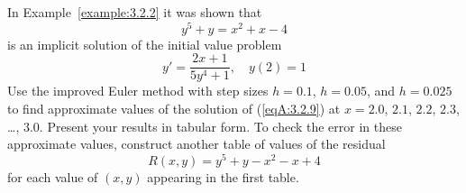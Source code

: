 \documentclass{ximera}
\begin{document}
\begin{problem}\label{exer:3.2.9}
In Example~\ref{example:3.2.2} it was shown that
$$
y^5+y=x^2+x-4
$$
is an implicit solution of  the initial value problem
\begin{equation}\label{eqA:3.2.9}
y'=\frac{2x+1}{5y^4+1},\quad y(2)=1
\end{equation}
Use the improved Euler method with step sizes $h=0.1$, $h=0.05$, and
$h=0.025$ to find approximate values of the solution of (\ref{eqA:3.2.9}) at
$x=2.0$, $2.1$, $2.2$, $2.3$, \dots, $3.0$. Present your results in tabular
form. To
check the error in these approximate values, construct another table
of values of the residual
$$
R(x,y)=y^5+y-x^2-x+4
$$
for each value of $(x,y)$ appearing in the first table.
\end{problem}
\end{document}
